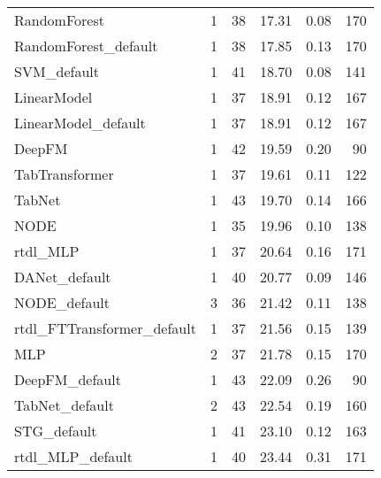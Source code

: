 \begin{tabular}{lrrrrr}
RandomForest               &                  1 &  38 &  17.31 &                           0.08 &   170 \\
RandomForest_default       &                  1 &  38 &  17.85 &                           0.13 &   170 \\
SVM_default                &                  1 &  41 &  18.70 &                           0.08 &   141 \\
LinearModel                &                  1 &  37 &  18.91 &                           0.12 &   167 \\
LinearModel_default        &                  1 &  37 &  18.91 &                           0.12 &   167 \\
DeepFM                     &                  1 &  42 &  19.59 &                           0.20 &    90 \\
TabTransformer             &                  1 &  37 &  19.61 &                           0.11 &   122 \\
TabNet                     &                  1 &  43 &  19.70 &                           0.14 &   166 \\
NODE                       &                  1 &  35 &  19.96 &                           0.10 &   138 \\
rtdl_MLP                   &                  1 &  37 &  20.64 &                           0.16 &   171 \\
DANet_default              &                  1 &  40 &  20.77 &                           0.09 &   146 \\
NODE_default               &                  3 &  36 &  21.42 &                           0.11 &   138 \\
rtdl_FTTransformer_default &                  1 &  37 &  21.56 &                           0.15 &   139 \\
MLP                        &                  2 &  37 &  21.78 &                           0.15 &   170 \\
DeepFM_default             &                  1 &  43 &  22.09 &                           0.26 &    90 \\
TabNet_default             &                  2 &  43 &  22.54 &                           0.19 &   160 \\
STG_default                &                  1 &  41 &  23.10 &                           0.12 &   163 \\
rtdl_MLP_default           &                  1 &  40 &  23.44 &                           0.31 &   171 \\

\end{tabular}
